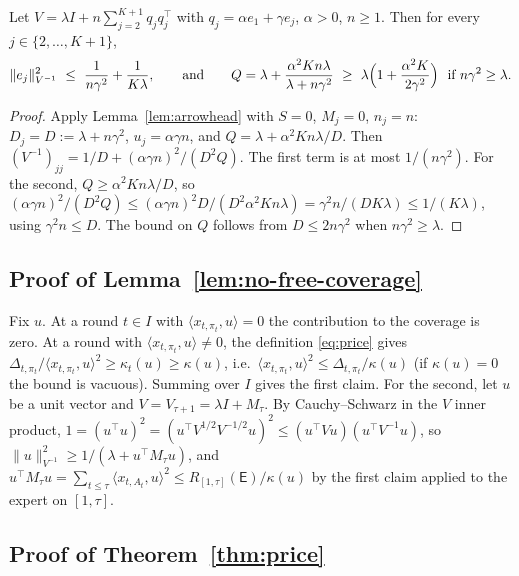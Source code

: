 \documentclass[anon]{alt2027} %
\providecommand{\qed}{\hfill\jmlrBlackBox}
\newcommand{\Exp}{\mathsf{E}}
\begin{document}
\begin{lemma}
\label{lem:cat-handoff}
Let $V=\lambda I+n\sum_{j=2}^{K+1}q_jq_j^\top$ with $q_j=\alpha e_1+\gamma e_j$, $\alpha>0$,
$n\ge1$. Then for every $j\in\{2,\dots,K+1\}$,
\[
\|e_j\|^2_{V^{-1}}\ \le\ \frac1{n\gamma^2}+\frac1{K\lambda},
\qquad\text{and}\qquad
Q=\lambda+\frac{\alpha^2Kn\lambda}{\lambda+n\gamma^2}\ \ge\ \lambda\Bigl(1+\frac{\alpha^2K}{2\gamma^2}\Bigr)\ \text{ if } n\gamma^2\ge\lambda .
\]
\end{lemma}

\begin{proof}
Apply Lemma~\ref{lem:arrowhead} with $S=0$, $M_j=0$, $n_j=n$: $D_j=D:=\lambda+n\gamma^2$,
$u_j=\alpha \gamma n$, and $Q=\lambda+\alpha^2Kn\lambda/D$. Then
$(V^{-1})_{jj}=1/D+(\alpha \gamma n)^2/(D^2Q)$. The first term is at most $1/(n\gamma^2)$.
For the second, $Q\ge\alpha^2Kn\lambda/D$, so
$(\alpha \gamma n)^2/(D^2Q)\le(\alpha \gamma n)^2D/(D^2\alpha^2Kn\lambda)=\gamma^2n/(DK\lambda)\le1/(K\lambda)$,
using $\gamma^2n\le D$. The bound on $Q$ follows from $D\le2n\gamma^2$ when $n\gamma^2\ge\lambda$.
\end{proof}

\subsection{Proof of Lemma~\ref{lem:no-free-coverage}}

Fix $u$. At a round $t\in I$ with $\langle x_{t,\pi_t},u\rangle=0$ the
contribution to the coverage is zero. At a round with
$\langle x_{t,\pi_t},u\rangle\ne0$, the definition \eqref{eq:price} gives
$\Delta_{t,\pi_t}/\langle x_{t,\pi_t},u\rangle^2\ge\kappa_t(u)\ge\kappa(u)$, i.e.\
$\langle x_{t,\pi_t},u\rangle^2\le\Delta_{t,\pi_t}/\kappa(u)$ (if $\kappa(u)=0$ the bound
is vacuous). Summing over $I$ gives the first claim. For the second, let
$u$ be a unit vector and $V=V_{\tau+1}=\lambda I+M_\tau$. By Cauchy--Schwarz in
the $V$ inner product,
$1=(u^\top u)^2=(u^\top V^{1/2}V^{-1/2}u)^2\le(u^\top Vu)(u^\top V^{-1}u)$, so
$\|u\|^2_{V^{-1}}\ge1/(\lambda+u^\top M_\tau u)$, and
$u^\top M_\tau u=\sum_{t\le\tau}\langle x_{t,A_t},u\rangle^2\le R_{[1,\tau]}(\Exp)/\kappa(u)$
by the first claim applied to the expert on $[1,\tau]$. \qed

\subsection{Proof of Theorem~\ref{thm:price}}
\end{document}
